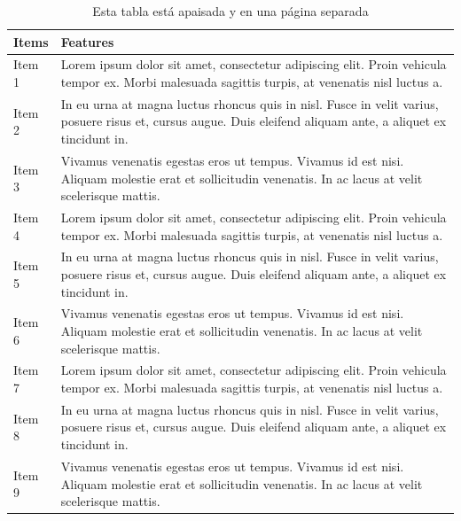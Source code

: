 \documentclass[12pt,a4paper,oneside,]{book}
\numberwithin{dummy}{section}
\theoremstyle{ocrenumbox}
\theoremstyle{blacknumex}
\theoremstyle{blacknumbox}
\theoremstyle{ocrenum}
\theoremstyle{ocrenum}
\begin{document}
\begin{landscape}\begin{table}

\caption{\label{tab:unnamed-chunk-35}\label{tab:apaisada}Esta tabla 
          est\'a apaisada y en una p\'agina separada}
\centering
\begin{tabular}[t]{>{\raggedright\arraybackslash}p{2cm}>{\raggedright\arraybackslash}p{10cm}}
\toprule
Items & Features\\
\midrule
Item 1 & Lorem ipsum dolor sit amet, consectetur adipiscing elit.
    Proin vehicula tempor ex. Morbi malesuada sagittis turpis,
    at venenatis nisl luctus \vphantom{2} a.\\
Item 2 & In eu urna at magna luctus rhoncus quis in nisl. Fusce in velit
    varius, posuere risus et, cursus augue. Duis eleifend aliquam ante,
    a aliquet ex tincidunt \vphantom{2} in.\\
Item 3 & Vivamus venenatis egestas eros ut tempus. Vivamus id est nisi.
    Aliquam molestie erat et sollicitudin venenatis. In ac lacus at
    velit scelerisque \vphantom{2} mattis.\\
Item 4 & Lorem ipsum dolor sit amet, consectetur adipiscing elit.
    Proin vehicula tempor ex. Morbi malesuada sagittis turpis,
    at venenatis nisl luctus \vphantom{1} a.\\
Item 5 & In eu urna at magna luctus rhoncus quis in nisl. Fusce in velit
    varius, posuere risus et, cursus augue. Duis eleifend aliquam ante,
    a aliquet ex tincidunt \vphantom{1} in.\\
\addlinespace
Item 6 & Vivamus venenatis egestas eros ut tempus. Vivamus id est nisi.
    Aliquam molestie erat et sollicitudin venenatis. In ac lacus at
    velit scelerisque \vphantom{1} mattis.\\
Item 7 & Lorem ipsum dolor sit amet, consectetur adipiscing elit.
    Proin vehicula tempor ex. Morbi malesuada sagittis turpis,
    at venenatis nisl luctus a.\\
Item 8 & In eu urna at magna luctus rhoncus quis in nisl. Fusce in velit
    varius, posuere risus et, cursus augue. Duis eleifend aliquam ante,
    a aliquet ex tincidunt in.\\
Item 9 & Vivamus venenatis egestas eros ut tempus. Vivamus id est nisi.
    Aliquam molestie erat et sollicitudin venenatis. In ac lacus at
    velit scelerisque mattis.\\
\bottomrule
\end{tabular}
\end{table}
\end{landscape}
\end{document}
